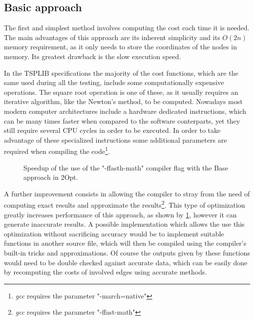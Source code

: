 \subsection{Basic approach}

The first and simplest method involves computing the cost each time it is needed. 
The main advantages of this approach are its inherent simplicity and its $O(2n)$ memory requirement, as it only needs to store the coordinates of the nodes in memory.
Its greatest drawback is the slow execution speed.

In the TSPLIB specifications the majority of the cost functions, which are the same used during all the testing, include some computationally expensive operations.
The square root operation is one of these, as it usually requires an iterative algorithm, like the Newton's method\cite{newtonMethod}, to be computed.
Nowadays most modern computer architectures include a hardware dedicated instructions, which can be many times faster when compared to the software conterparts, yet they still require several CPU cycles in order to be executed.
In order to take advantage of these specialized instructions some additional parameters are required when compiling the code\footnote{\textit{gcc} requires the parameter "-march=native"}.

\begin{figure}[htbp]
    \centering
    \caption{Speedup of the use of the "-ffasth-math" compiler flag with the Base approach in 2Opt.} \label{fig:baseHWSpecific}
\end{figure}

A further improvement consists in allowing the compiler to stray from the need of computing exact results and approximate the results\footnote{\textit{gcc} requires the parameter "-ffast-math"}.
This type of optimization greatly increases performance of this approach, as shown by \figurename{ \ref{fig:baseHWSpecific}}, however it can generate inaccurate results.
A possible implementation which allows the use this optimization without sacrificing accuracy would be to implement suitable functions in another source file, which will then be compiled using the compiler's built-in tricks and approximations.
Of course the outputs given by these functions would need to be double checked against accurate data, which can be easily done by recomputing the costs of involved edges using accurate methods.

